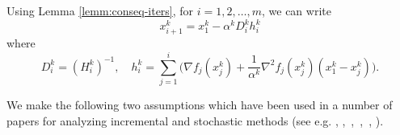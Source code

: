 \documentclass[final,numbook]{svjour3}
\begin{document}
Using Lemma \ref{lemm:conseq-iters}, for $i=1,2,\dots,m$, we can write
\begin{equation}\label{eq-iter-ver-compact} x_{i+1}^{k} = x_1^k - \alpha^k D_i^k h_i^k 
\end{equation}
where 
\begin{equation}\label{eq-iter-ver-compact2}
D_i^k = (H_i^k)^{-1}, \quad h_i^k = \sum_{j=1}^i \bigg( {{\nabla f_j (x_j^k)}} + \frac{1}{\alpha^k} {{\nabla^2 f_j (x_j^k)}} (x_1^k - x_j^k) \bigg).
\end{equation}

We make the following two assumptions which have been used in a number of papers for analyzing incremental and stochastic methods (see e.g. \cite{Bertsekas1996incremental}, \cite{AlgEkfs2003},~\cite[Theorem 3.1]{ManSol98IncGradMomentum},~\cite[Assumption 1]{StocBFGSRibeiro14},~\cite{SrebroDane2013}, \cite{BachSagaMethod14}).
\end{document}

